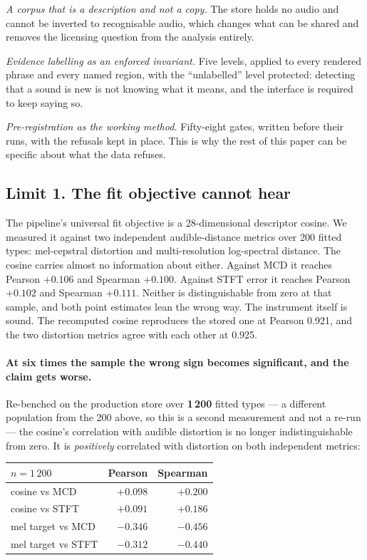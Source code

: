 \documentclass[10pt,twocolumn,a4paper]{article}
\begin{document}
\emph{A corpus that is a description and not a copy.} The store holds no audio and
cannot be inverted to recognisable audio, which changes what can be shared and removes the
licensing question from the analysis entirely.

\emph{Evidence labelling as an enforced invariant.} Five levels, applied to every rendered
phrase and every named region, with the ``unlabelled'' level protected: detecting that a
sound is new is not knowing what it means, and the interface is required to keep saying so.

\emph{Pre-registration as the working method.} Fifty-eight gates, written before their runs,
with the refusals kept in place. This is why the rest of this paper can be specific about
what the data refuses.

\subsection{Limit 1. The fit objective cannot hear}

The pipeline's universal fit objective is a 28-dimensional descriptor cosine. We measured it
against two independent audible-distance metrics over 200 fitted types: mel-cepstral
distortion \citep{kubichek1993} and multi-resolution log-spectral distance. The cosine
carries almost no information about either. Against MCD it reaches Pearson $+0.106$ and
Spearman $+0.100$. Against STFT error it reaches Pearson $+0.102$ and Spearman $+0.111$.
Neither is distinguishable from zero at that sample, and both point estimates lean the wrong
way. The instrument itself is sound. The recomputed cosine reproduces the stored one at Pearson
0.921, and the two distortion metrics agree with each other at 0.925.

\paragraph{At six times the sample the wrong sign becomes significant, and the claim gets
worse.} Re-benched on the production store over \textbf{1\,200} fitted types --- a different
population from the 200 above, so this is a second measurement and not a re-run --- the
cosine's correlation with audible distortion is no longer indistinguishable from zero. It is
\emph{positively} correlated with distortion on both independent metrics:

\begin{center}\footnotesize
\setlength{\tabcolsep}{4pt}
\begin{tabular}{@{}l r r@{}}
\toprule
$n = 1\,200$ & Pearson & Spearman \\
\midrule
cosine vs MCD      & $+0.098$ & $+0.200$ \\
cosine vs STFT     & $+0.091$ & $+0.186$ \\
mel target vs MCD  & $-0.346$ & $\mathbf{-0.456}$ \\
mel target vs STFT & $-0.312$ & $-0.440$ \\
\bottomrule
\end{tabular}
\end{center}
\end{document}
